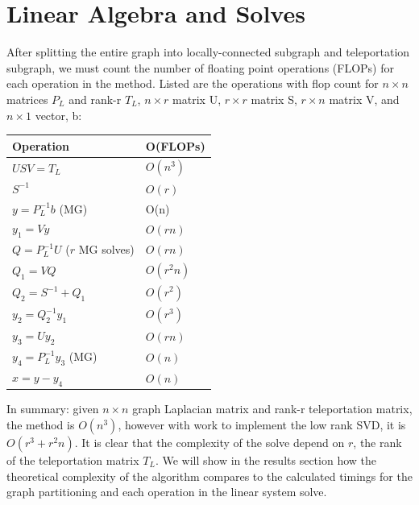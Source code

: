\documentclass{article}
\begin{document}
\section{Linear Algebra and Solves}
After splitting the entire graph into locally-connected subgraph and teleportation subgraph, we must count the number of floating point operations (FLOPs) for each operation in the method. Listed are the operations with flop count for $n\times n$ matrices $P_L$ and rank-r $T_L$, $n\times r$ matrix U, $r\times r$ matrix S, $r\times n$ matrix V, and $n\times 1$ vector, b:\\
\begin{center}
\renewcommand{\arraystretch}{1.5}
    \begin{tabular}{ | l | l |}
    \hline
    \textbf{Operation} & \textbf{O(FLOPs)} \\ \hline
    $USV = T_L$ & $O(n^3)$ \\ \hline
    $S^{-1}$ & $O(r)$ \\ \hline
    $y = P_L^{-1}b$ (MG) & O(n)  \\  \hline
    $y_1 = Vy$ & $O(rn)$ \\ \hline
    $Q = P_L^{-1}U$ ($r$ MG solves) & $O(rn)$ \\ \hline
    $Q_1 = VQ$ & $O(r^2 n)$ \\ \hline
    $Q_2 = S^{-1} + Q_1$ & $O(r^2)$ \\ \hline
    $y_2 = Q_2^{-1}y_1$ & $O(r^3)$ \\ \hline
    $y_3 = Uy_2$ & $O(rn)$ \\ \hline
    $y_4 = P_L^{-1}y_3$ (MG) & $O(n)$ \\ \hline
    $x = y - y_4$ & $O(n)$ \\
    \hline
    \end{tabular}
\end{center}
In summary: given $n\times n$ graph Laplacian matrix and rank-r teleportation matrix, the method is $O(n^3)$, however with work to implement the low rank SVD, it is $O(r^3+r^2 n)$. It is clear that the complexity of the solve depend on $r$, the rank of the teleportation matrix $T_L$. We will show in the results section how the theoretical complexity of the algorithm compares to the calculated timings for the graph partitioning and each operation in the linear system solve.









\end{document}
